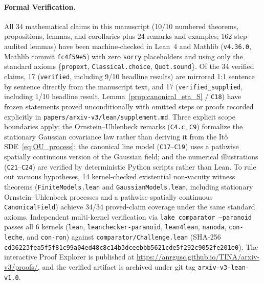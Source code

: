 \documentclass[11pt]{article}
\begin{document}
\paragraph{Formal Verification.}
All 34 mathematical claims in this manuscript (10/10 numbered theorems,
propositions, lemmas, and corollaries plus 24 remarks and examples; 162
step-audited lemmas) have been machine-checked in Lean~4 and Mathlib
(\texttt{v4.36.0}, Mathlib commit \texttt{fc4f59e5}) with zero \texttt{sorry}
placeholders and using only the standard axioms
\{\texttt{propext}, \texttt{Classical.choice}, \texttt{Quot.sound}\}.
Of the 34 verified claims, 17 (\texttt{verified}, including 9/10 headline
results) are mirrored 1:1 sentence by sentence directly from the manuscript
text, and 17 (\texttt{verified\_supplied}, including 1/10 headline result,
Lemma~\ref{prop:canonical_eta_S} / \texttt{C18}) have frozen statements proved
unconditionally with omitted steps or proofs recorded explicitly in
\nolinkurl{papers/arxiv-v3/lean/supplement.md}.
Three explicit scope boundaries apply: the Ornstein--Uhlenbeck remarks
(\texttt{C4.c}, \texttt{C9}) formalize the stationary Gaussian covariance law
rather than deriving it from the It\^o SDE~\eqref{eq:OU_process}; the
canonical line model (\texttt{C17}--\texttt{C19}) uses a pathwise spatially
continuous version of the Gaussian field; and the numerical illustrations
(\texttt{C21}--\texttt{C24}) are verified by deterministic Python scripts
rather than Lean.
To rule out vacuous hypotheses, 14 kernel-checked existential non-vacuity
witness theorems (\nolinkurl{FiniteModels.lean} and
\nolinkurl{GaussianModels.lean}, including stationary Ornstein--Uhlenbeck
processes and a pathwise spatially continuous \texttt{CanonicalField}) achieve
34/34 proved-claim coverage under the same standard axioms.
Independent multi-kernel verification via \texttt{lake comparator --paranoid}
passes all 6 kernels (\texttt{lean}, \texttt{leanchecker-paranoid},
\texttt{lean4lean}, \texttt{nanoda}, \texttt{con-leche}, and \texttt{con-ron})
against \nolinkurl{comparator/Challenge.lean} (SHA-256
\nolinkurl{cd36223fea5f5f81c99a04ed48c8c14b3dceebbb5621cde5f292c9052fe201e0}).
The interactive Proof Explorer is published at
\url{https://anrgusc.github.io/TINA/arxiv-v3/proofs/}, and the verified
artifact is archived under git tag \texttt{arxiv-v3-lean-v1.0}.




\appendix
{}

\end{document}
